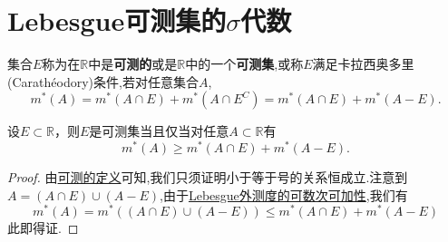 \documentclass[lang=cn,newtx,10pt,scheme=chinese]{../Template/elegantbook}
\begin{document}
\section{Lebesgue可测集的$\sigma $代数}


\begin{definition}[可测]\label{definition:可测}
集合\(E\)称为在$\mathbb{R}$中是\textbf{可测的}或是$\mathbb{R}$中的一个\textbf{可测集},或称$E$满足卡拉西奥多里(Carathéodory)条件,若对任意集合\(A\),
\[m^*(A)=m^*(A\cap E)+m^*(A\cap E^C)=m^*(A\cap E)+m^*(A - E).\] 
\end{definition}

\begin{proposition}[可测的充要条件]\label{proposition:可测的充要条件1}
  设\(E\subset\mathbb{R}\)，则\(E\)是可测集当且仅当对任意\(A\subset\mathbb{R}\)有
\[m^*(A)\geqslant  m^*(A\cap E)+m^*(A - E).\]
\end{proposition}
\begin{proof}
  由\hyperref[definition:可测]{可测的定义}可知,我们只须证明小于等于号的关系恒成立.注意到\(A=(A\cap E)\cup(A - E)\),由于\hyperref[proposition:Lebesgue外测度的可数次可加性]{Lebesgue外测度的可数次可加性},我们有
  \[m^*(A)=m^*((A\cap E)\cup(A - E))\leqslant  m^*(A\cap E)+m^*(A - E)\]
  此即得证. 

\end{proof}
\end{document}
